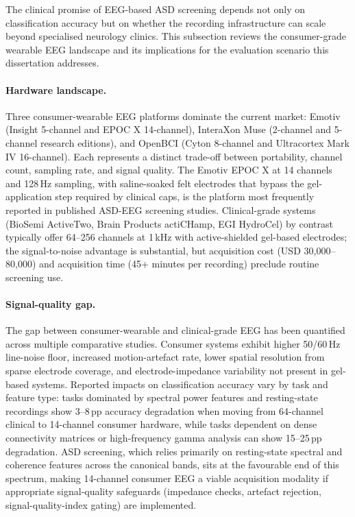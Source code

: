 The clinical promise of EEG-based ASD screening depends not only on classification accuracy but on whether the recording infrastructure can scale beyond specialised neurology clinics. This subsection reviews the consumer-grade wearable EEG landscape and its implications for the evaluation scenario this dissertation addresses.

\paragraph{Hardware landscape.}
Three consumer-wearable EEG platforms dominate the current market: Emotiv (Insight 5-channel and EPOC X 14-channel), InteraXon Muse (2-channel and 5-channel research editions), and OpenBCI (Cyton 8-channel and Ultracortex Mark IV 16-channel). Each represents a distinct trade-off between portability, channel count, sampling rate, and signal quality. The Emotiv EPOC X at 14 channels and 128\,Hz sampling, with saline-soaked felt electrodes that bypass the gel-application step required by clinical caps, is the platform most frequently reported in published ASD-EEG screening studies. Clinical-grade systems (BioSemi ActiveTwo, Brain Products actiCHamp, EGI HydroCel) by contrast typically offer 64--256 channels at 1\,kHz with active-shielded gel-based electrodes; the signal-to-noise advantage is substantial, but acquisition cost (USD 30{,}000--80{,}000) and acquisition time (45+ minutes per recording) preclude routine screening use.

\paragraph{Signal-quality gap.}
The gap between consumer-wearable and clinical-grade EEG has been quantified across multiple comparative studies. Consumer systems exhibit higher 50/60\,Hz line-noise floor, increased motion-artefact rate, lower spatial resolution from sparse electrode coverage, and electrode-impedance variability not present in gel-based systems. Reported impacts on classification accuracy vary by task and feature type: tasks dominated by spectral power features and resting-state recordings show 3--8\,pp accuracy degradation when moving from 64-channel clinical to 14-channel consumer hardware, while tasks dependent on dense connectivity matrices or high-frequency gamma analysis can show 15--25\,pp degradation. ASD screening, which relies primarily on resting-state spectral and coherence features across the canonical bands, sits at the favourable end of this spectrum, making 14-channel consumer EEG a viable acquisition modality if appropriate signal-quality safeguards (impedance checks, artefact rejection, signal-quality-index gating) are implemented.

